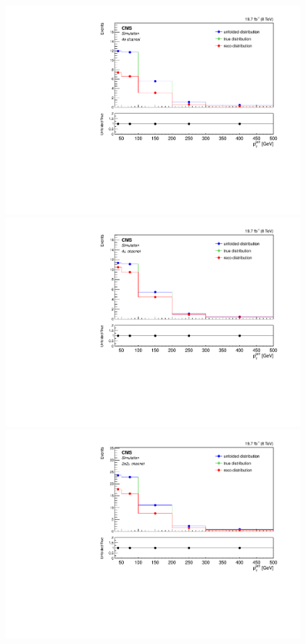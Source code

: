 \begin{figure}[hbtp]
  \begin{center}
    \includegraphics[width=0.8\cmsFigWidth]{Figures/Unfolding/MCTests/PtJet1_ZZTo4e_MadMatrix_MadDistr_FullSample_fr}     
    \includegraphics[width=0.8\cmsFigWidth]{Figures/Unfolding/MCTests/PtJet1_ZZTo4m_MadMatrix_MadDistr_FullSample_fr}     
    \includegraphics[width=0.8\cmsFigWidth]{Figures/Unfolding/MCTests/PtJet1_ZZTo2e2m_MadMatrix_MadDistr_FullSample_fr}

\end{center}
\end{figure}
